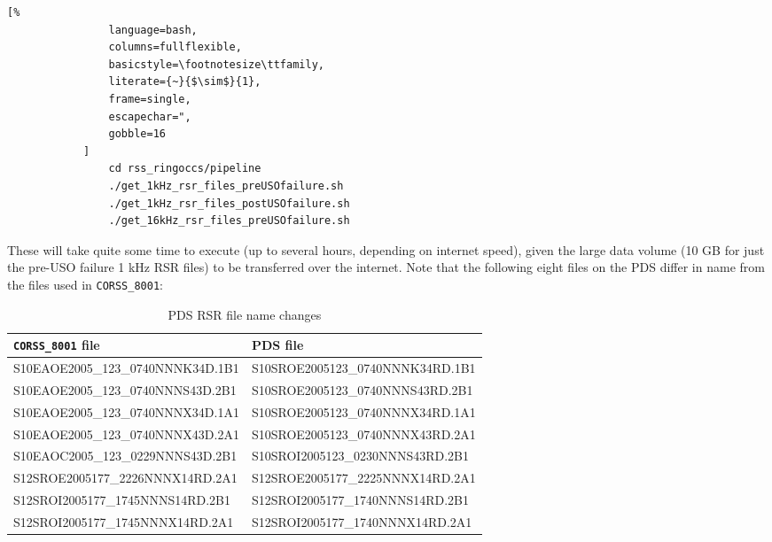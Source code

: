 \documentclass[titlepage, 12pt]{article}
\begin{document}
            \begin{lstlisting}[%
                language=bash,
                columns=fullflexible,
                basicstyle=\footnotesize\ttfamily,
                literate={~}{$\sim$}{1},
                frame=single,
                escapechar=",
                gobble=16
            ]
                cd rss_ringoccs/pipeline
                ./get_1kHz_rsr_files_preUSOfailure.sh
                ./get_1kHz_rsr_files_postUSOfailure.sh
                ./get_16kHz_rsr_files_preUSOfailure.sh
            \end{lstlisting}
            These will take quite some time to execute (up to several hours, depending on internet speed),
            given the large data volume (10 GB for just the pre-USO failure 1 kHz RSR files) to be transferred
            over the internet.
            Note that the following eight files on the PDS
            differ in name from the files used in \texttt{CORSS\_8001}:
            \begin{table}[H]
                \centering
                \begin{tabular}{l l}
                    \hline
                    \texttt{CORSS\_8001} file & PDS file\\
                    \hline
                    S10EAOE2005\_123\_0740NNNK34D.1B1&
                    S10SROE2005123\_0740NNNK34RD.1B1\\
                    S10EAOE2005\_123\_0740NNNS43D.2B1&
                    S10SROE2005123\_0740NNNS43RD.2B1\\
                    S10EAOE2005\_123\_0740NNNX34D.1A1&
                    S10SROE2005123\_0740NNNX34RD.1A1\\
                    S10EAOE2005\_123\_0740NNNX43D.2A1&
                    S10SROE2005123\_0740NNNX43RD.2A1\\
                    S10EAOC2005\_123\_0229NNNS43D.2B1&
                    S10SROI2005123\_0230NNNS43RD.2B1\\
                    S12SROE2005177\_2226NNNX14RD.2A1&
                    S12SROE2005177\_2225NNNX14RD.2A1\\
                    S12SROI2005177\_1745NNNS14RD.2B1&
                    S12SROI2005177\_1740NNNS14RD.2B1\\
                    S12SROI2005177\_1745NNNX14RD.2A1&
                    S12SROI2005177\_1740NNNX14RD.2A1\\
                    \hline
                \end{tabular}
                \caption[Minor name changes in RSR files]
                    {PDS RSR file name changes}
                \label{tab:rsr_files with different names}
            \end{table}
\end{document}
